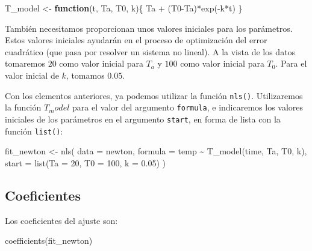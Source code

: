 \documentclass[
  degree=mecinf,
  title=normal,
  toc=normal,
  bib=normal]{mnye}
\newenvironment{Shaded}{\begin{snugshade}}{\end{snugshade}}
\newcommand{\AttributeTok}[1]{\textcolor[rgb]{0.77,0.63,0.00}{#1}}
\newcommand{\ControlFlowTok}[1]{\textcolor[rgb]{0.13,0.29,0.53}{\textbf{#1}}}
\newcommand{\DecValTok}[1]{\textcolor[rgb]{0.00,0.00,0.81}{#1}}
\newcommand{\FloatTok}[1]{\textcolor[rgb]{0.00,0.00,0.81}{#1}}
\newcommand{\FunctionTok}[1]{\textcolor[rgb]{0.00,0.00,0.00}{#1}}
\newcommand{\NormalTok}[1]{#1}
\newcommand{\OtherTok}[1]{\textcolor[rgb]{0.56,0.35,0.01}{#1}}
\newcommand{\SpecialCharTok}[1]{\textcolor[rgb]{0.00,0.00,0.00}{#1}}
\begin{document}
\begin{Shaded}
\begin{Highlighting}[]
\NormalTok{T\_model }\OtherTok{\textless{}{-}} \ControlFlowTok{function}\NormalTok{(t, Ta, T0, k)\{}
\NormalTok{    Ta }\SpecialCharTok{+}\NormalTok{ (T0}\SpecialCharTok{{-}}\NormalTok{Ta)}\SpecialCharTok{*}\FunctionTok{exp}\NormalTok{(}\SpecialCharTok{{-}}\NormalTok{k}\SpecialCharTok{*}\NormalTok{t)}
\NormalTok{\}}
\end{Highlighting}
\end{Shaded}

También necesitamos proporcionan unos valores iniciales para los parámetros. Estos valores iniciales ayudarán en el proceso de optimización del error cuadrático (que pasa por resolver un sistema no lineal). A la vista de los datos tomaremos \(20\) como valor inicial para \(T_a\) y \(100\) como valor inicial para \(T_0\). Para el valor inicial de \(k\), tomamos \(0.05\).

Con los elementos anteriores, ya podemos utilizar la función \texttt{nls()}. Utilizaremos la función \(T_model\) para el valor del argumento \texttt{formula}, e indicaremos los valores iniciales de los parámetros en el argumento \texttt{start}, en forma de lista con la función \texttt{list()}:

\begin{Shaded}
\begin{Highlighting}[]
\NormalTok{fit\_newton }\OtherTok{\textless{}{-}} \FunctionTok{nls}\NormalTok{(}
    \AttributeTok{data =}\NormalTok{ newton, }
    \AttributeTok{formula =}\NormalTok{ temp }\SpecialCharTok{\textasciitilde{}} \FunctionTok{T\_model}\NormalTok{(time, Ta, T0, k),}
    \AttributeTok{start =} \FunctionTok{list}\NormalTok{(}\AttributeTok{Ta =} \DecValTok{20}\NormalTok{, }\AttributeTok{T0 =} \DecValTok{100}\NormalTok{,  }\AttributeTok{k =} \FloatTok{0.05}\NormalTok{)}
\NormalTok{)}
\end{Highlighting}
\end{Shaded}

\hypertarget{coeficientes-1}{%
\subsection{Coeficientes}\label{coeficientes-1}}

Los coeficientes del ajuste son:

\begin{Shaded}
\begin{Highlighting}[]
\FunctionTok{coefficients}\NormalTok{(fit\_newton)}
\end{Highlighting}
\end{Shaded}
\end{document}
